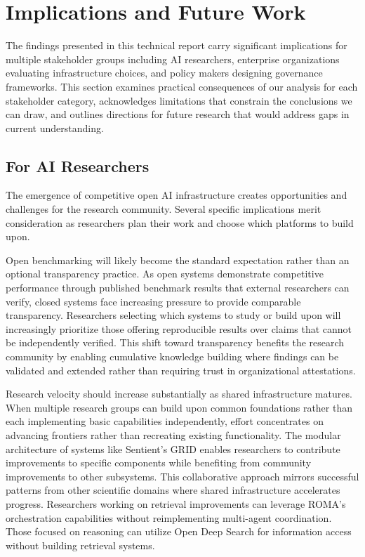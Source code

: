 
\section{Implications and Future Work}

The findings presented in this technical report carry significant implications for multiple stakeholder groups including AI researchers, enterprise organizations evaluating infrastructure choices, and policy makers designing governance frameworks. This section examines practical consequences of our analysis for each stakeholder category, acknowledges limitations that constrain the conclusions we can draw, and outlines directions for future research that would address gaps in current understanding.

\subsection{For AI Researchers}

The emergence of competitive open AI infrastructure creates opportunities and challenges for the research community. Several specific implications merit consideration as researchers plan their work and choose which platforms to build upon.

Open benchmarking will likely become the standard expectation rather than an optional transparency practice. As open systems demonstrate competitive performance through published benchmark results that external researchers can verify, closed systems face increasing pressure to provide comparable transparency. Researchers selecting which systems to study or build upon will increasingly prioritize those offering reproducible results over claims that cannot be independently verified. This shift toward transparency benefits the research community by enabling cumulative knowledge building where findings can be validated and extended rather than requiring trust in organizational attestations.

Research velocity should increase substantially as shared infrastructure matures. When multiple research groups can build upon common foundations rather than each implementing basic capabilities independently, effort concentrates on advancing frontiers rather than recreating existing functionality. The modular architecture of systems like Sentient's GRID enables researchers to contribute improvements to specific components while benefiting from community improvements to other subsystems. This collaborative approach mirrors successful patterns from other scientific domains where shared infrastructure accelerates progress. Researchers working on retrieval improvements can leverage ROMA's orchestration capabilities without reimplementing multi-agent coordination. Those focused on reasoning can utilize Open Deep Search for information access without building retrieval systems.


